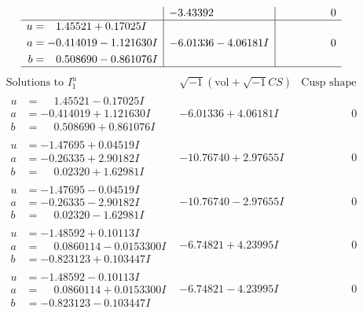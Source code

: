 \documentclass[1p]{elsarticle_modified}
\theoremstyle{definition}
\newcommand{\I}{\sqrt{-1}}
\begin{document}
$$\begin{array}{c|c|c}
 & -3.43392\phantom{ +0.000000I} & \phantom{-0.000000 } 0 \\ \hline\begin{aligned}
u &= \phantom{-}1.45521 + 0.17025 I \\
a &= -0.414019 - 1.121630 I \\
b &= \phantom{-}0.508690 - 0.861076 I\end{aligned}
 & -6.01336 - 4.06181 I & \phantom{-0.000000 } 0\\
 \hline 
 \end{array}$$\newpage$$\begin{array}{c|c|c}  
\text{Solutions to }I^u_{1}& \I (\text{vol} + \sqrt{-1}CS) & \text{Cusp shape}\\
 \hline 
\begin{aligned}
u &= \phantom{-}1.45521 - 0.17025 I \\
a &= -0.414019 + 1.121630 I \\
b &= \phantom{-}0.508690 + 0.861076 I\end{aligned}
 & -6.01336 + 4.06181 I & \phantom{-0.000000 } 0 \\ \hline\begin{aligned}
u &= -1.47695 + 0.04519 I \\
a &= -0.26335 + 2.90182 I \\
b &= \phantom{-}0.02320 + 1.62981 I\end{aligned}
 & -10.76740 + 2.97655 I & \phantom{-0.000000 } 0 \\ \hline\begin{aligned}
u &= -1.47695 - 0.04519 I \\
a &= -0.26335 - 2.90182 I \\
b &= \phantom{-}0.02320 - 1.62981 I\end{aligned}
 & -10.76740 - 2.97655 I & \phantom{-0.000000 } 0 \\ \hline\begin{aligned}
u &= -1.48592 + 0.10113 I \\
a &= \phantom{-}0.0860114 - 0.0153300 I \\
b &= -0.823123 + 0.103447 I\end{aligned}
 & -6.74821 + 4.23995 I & \phantom{-0.000000 } 0 \\ \hline\begin{aligned}
u &= -1.48592 - 0.10113 I \\
a &= \phantom{-}0.0860114 + 0.0153300 I \\
b &= -0.823123 - 0.103447 I\end{aligned}
 & -6.74821 - 4.23995 I & \phantom{-0.000000 } 0 \\ \hline\begin{aligned}

\end{aligned}
\end{array}$$
\end{document}
